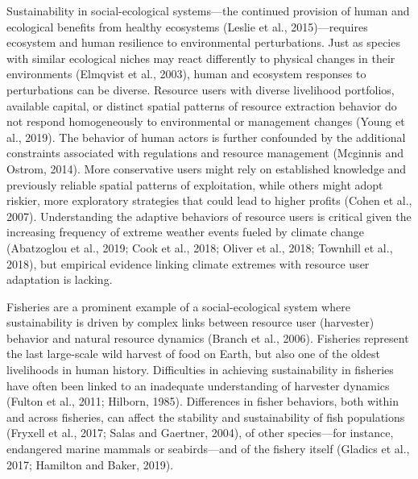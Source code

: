 \documentclass[]{elsarticle} %
\begin{document}
Sustainability in social-ecological systems---the continued provision of
human and ecological benefits from healthy ecosystems (Leslie et al.,
2015)---requires ecosystem and human resilience to environmental
perturbations. Just as species with similar ecological niches may react
differently to physical changes in their environments (Elmqvist et al.,
2003), human and ecosystem responses to perturbations can be diverse.
Resource users with diverse livelihood portfolios, available capital, or
distinct spatial patterns of resource extraction behavior do not respond
homogeneously to environmental or management changes (Young et al.,
2019). The behavior of human actors is further confounded by the
additional constraints associated with regulations and resource
management (Mcginnis and Ostrom, 2014). More conservative users might
rely on established knowledge and previously reliable spatial patterns
of exploitation, while others might adopt riskier, more exploratory
strategies that could lead to higher profits (Cohen et al., 2007).
Understanding the adaptive behaviors of resource users is critical given
the increasing frequency of extreme weather events fueled by climate
change (Abatzoglou et al., 2019; Cook et al., 2018; Oliver et al., 2018;
Townhill et al., 2018), but empirical evidence linking climate extremes
with resource user adaptation is lacking.

Fisheries are a prominent example of a social-ecological system where
sustainability is driven by complex links between resource user
(harvester) behavior and natural resource dynamics (Branch et al.,
2006). Fisheries represent the last large-scale wild harvest of food on
Earth, but also one of the oldest livelihoods in human history.
Difficulties in achieving sustainability in fisheries have often been
linked to an inadequate understanding of harvester dynamics (Fulton et
al., 2011; Hilborn, 1985). Differences in fisher behaviors, both within
and across fisheries, can affect the stability and sustainability of
fish populations (Fryxell et al., 2017; Salas and Gaertner, 2004), of
other species---for instance, endangered marine mammals or
seabirds---and of the fishery itself (Gladics et al., 2017; Hamilton and
Baker, 2019).
\end{document}
